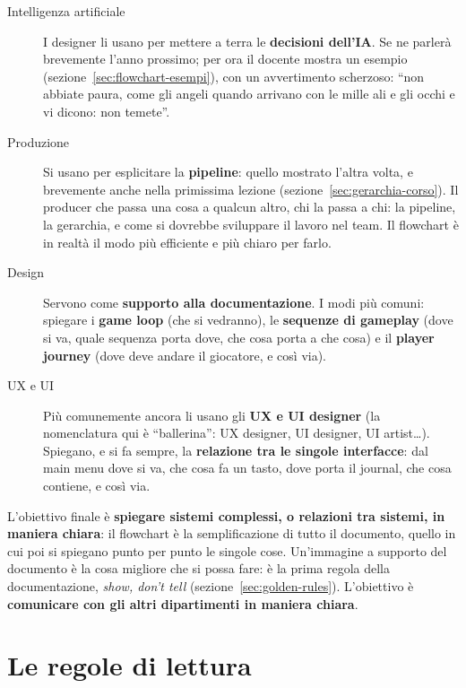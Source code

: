 \begin{description}
  \item[Intelligenza artificiale] I designer li usano per mettere a terra le
        \textbf{decisioni dell'IA}. Se ne parlerà brevemente l'anno
        prossimo; per ora il docente mostra un esempio
        (sezione~\ref{sec:flowchart-esempi}), con un avvertimento
        scherzoso: ``non abbiate paura, come gli angeli quando arrivano con
        le mille ali e gli occhi e vi dicono: non temete''.
  \item[Produzione] Si usano per esplicitare la \textbf{pipeline}: quello
        mostrato l'altra volta, e brevemente anche nella primissima lezione
        (sezione~\ref{sec:gerarchia-corso}). Il producer che passa una cosa a
        qualcun altro, chi la passa a chi: la pipeline, la gerarchia, e come
        si dovrebbe sviluppare il lavoro nel team. Il flowchart è in realtà
        il modo più efficiente e più chiaro per farlo.
  \item[Design] Servono come \textbf{supporto alla documentazione}. I modi più
        comuni: spiegare i \textbf{game loop} (che si vedranno), le
        \textbf{sequenze di gameplay} (dove si va, quale sequenza porta dove,
        che cosa porta a che cosa) e il \textbf{player journey} (dove deve
        andare il giocatore, e così via).
  \item[UX e UI] Più comunemente ancora li usano gli \textbf{UX e UI
        designer} (la nomenclatura qui è ``ballerina'': UX designer, UI
        designer, UI artist\dots). Spiegano, e si fa sempre, la
        \textbf{relazione tra le singole interfacce}: dal main menu dove si
        va, che cosa fa un tasto, dove porta il journal, che cosa contiene, e
        così via.
\end{description}

L'obiettivo finale è \textbf{spiegare sistemi complessi, o relazioni tra
sistemi, in maniera chiara}: il flowchart è la semplificazione di tutto il
documento, quello in cui poi si spiegano punto per punto le singole cose.
Un'immagine a supporto del documento è la cosa migliore che si possa fare:
è la prima regola della documentazione, \emph{show, don't tell}
(sezione~\ref{sec:golden-rules}). L'obiettivo è \textbf{comunicare con gli
altri dipartimenti in maniera chiara}.

\section{Le regole di lettura}
\label{sec:flowchart-regole}

